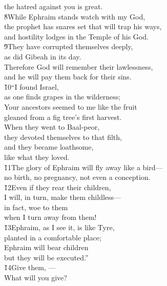 \begin{poetry}
\poemll    the hatred against you is great. \\
\poeml \v{8}While Ephraim stands watch with my God, \\
\poemll    the prophet has snares set that will trap his ways, \\
\poemlll       and hostility lodges in the Temple of his God. \\
\poeml \v{9}They have corrupted themselves deeply, \\
\poemll    as did Gibeah in its day. \\
\poeml Therefore God will remember their lawlessness, \\
\poemll    and he will pay them back for their sins. \\
\poeml \v{10}``I found Israel, \\
\poemll    as one finds grapes in the wilderness; \\
\poeml Your ancestors seemed to me like the fruit \\
\poemll    gleaned from a fig tree's first harvest. \\
\poeml When they went to Baal-peor, \\
\poemll    they devoted themselves to that filth, \\
\poeml and they became loathsome, \\
\poemll    like what they loved. \\
\poeml \v{11}The glory of Ephraim will fly away like a bird--- \\
\poemll    no birth, no pregnancy, not even a conception. \\
\poeml \v{12}Even if they rear their children, \\
\poemll    I will, in turn, make them childless--- \\
\poeml in fact, woe to them \\
\poemll    when I turn away from them! \\
\poeml \v{13}Ephraim, as I see it, is like Tyre, \\
\poemll    planted in a comfortable place; \\
\poeml Ephraim will bear children \\
\poemll    but they will be executed.'' \\
\poeml \v{14}Give them, --- \\
\poemll    What will you give? \\

\end{poetry}
